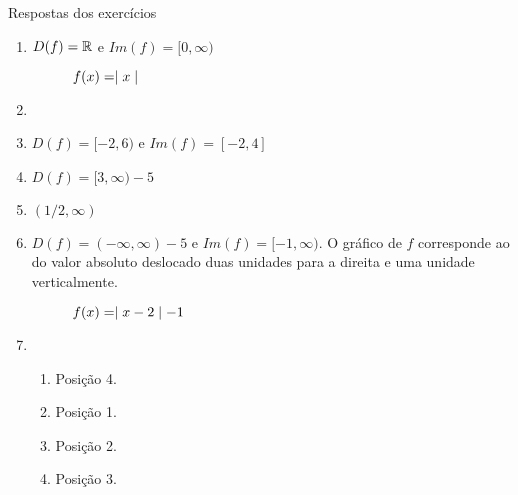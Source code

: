\begin{frame}[allowframebreaks]{Respostas dos exercícios}
\begin{enumerate}
        \skipframe

        \item $D(f) = \mathbb{R}$ e $Im(f) = [0, \infty)$

        \begin{figure}
        \centering
        \caption{$f(x) = \mid x \mid$}
        \end{figure}

        \item <colocar gráficos>

        \skipframe

        \item $D(f) = [-2, 6)$ e $Im(f) = [-2, 4]$

        \item $D(f) = [3, \infty) - {5}$

        \item $(1/2, \infty)$

        \skipframe

        \item $D(f) = (-\infty, \infty) - {5}$ e $Im(f) = [-1, \infty)$. O gráfico de $f$ corresponde ao do valor absoluto deslocado duas unidades para a direita e uma unidade verticalmente.

        \vspace{0.5cm}

        \begin{figure}
        \centering
        \caption{$f(x) = \mid x-2 \mid-1$}
        \end{figure}

        \skipframe

        \item 
        \begin{enumerate}[a]
            \item Posição 4.
            \item Posição 1.
            \item Posição 2.
            \item Posição 3.
        \end{enumerate}
    \end{enumerate}
\end{frame}